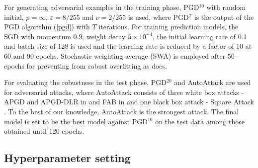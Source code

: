 \documentclass[nohyperref]{article}
\theoremstyle{plain}
\theoremstyle{definition}
\theoremstyle{remark}
\begin{document}
For generating adversarial examples in the training phase, PGD$^{10}$  with random initial, 
$p=\infty$, $\varepsilon = 8/255$ and $\nu = 2/255$ is used, where PGD$^T$ is the output of the PGD algorithm (\ref{pgd}) with $T$ iterations.
For training prediction models,
the SGD with momentum $0.9$, weight decay  $5 \times 10^{-4}$, the initial learning rate of 0.1 and batch size of 128 is used and the learning rate
is reduced by a factor of 10 at 60 and 90 epochs.
Stochastic weighting average (SWA) \citep{izmailov2018averaging} is employed after 50-epochs for preventing from robust overfitting \citep{rice2020overfitting} as \citet{chen2021robust} does.

For evaluating the robustness in the test phase, PGD$^{20}$ and AutoAttack are used for adversarial attacks, where AutoAttack consists of three white box attacks - APGD and APGD-DLR in \cite{croce2020reliable} and FAB in \cite{croce2020minimally} and one black box attack -  Square Attack \citep{andriushchenko2020square}. To the best of our knowledge, AutoAttack is the strongest attack.
The final model is set to be the best model against PGD$^{10}$ on the test data among those obtained until 120 epochs. 

\subsection{Hyperparameter setting}
\end{document}
